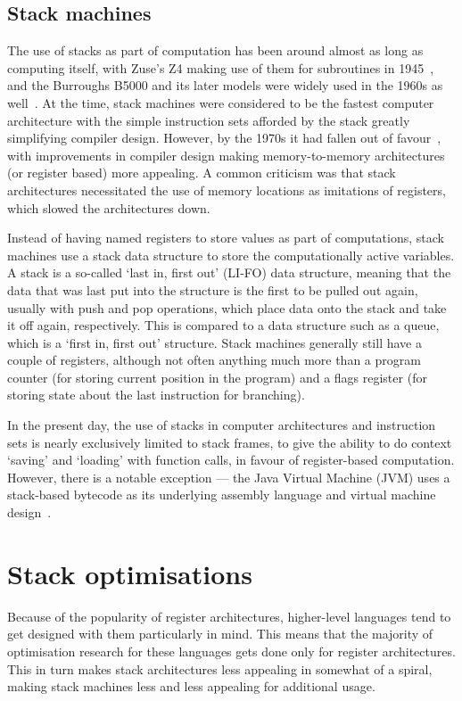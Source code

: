 \subsection{Stack machines}

The use of stacks as part of computation has been around almost as long as
computing itself, with Zuse's Z4 making use of them for subroutines in
1945~\cite{Speiser2000KZZ}, and the Burroughs B5000 and its later models were
widely used in the 1960s as well~\cite{Organick2014Computer}. At the time, stack
machines were considered to be the fastest computer architecture with the simple
instruction sets afforded by the stack greatly simplifying compiler design.
However, by the 1970s it had fallen out of favour~\cite{Myers1977CAS}, with
improvements in compiler design making memory-to-memory architectures (or
register based) more appealing. A common criticism was that stack architectures
necessitated the use of memory locations as imitations of registers, which
slowed the architectures down.

Instead of having named registers to store values as part of computations, stack
machines use a stack data structure to store the computationally active
variables. A stack is a so-called `last in, first out' (LI-FO) data structure,
meaning that the data that was last put into the structure is the first to be
pulled out again, usually with push and pop operations, which place data onto
the stack and take it off again, respectively. This is compared to a data
structure such as a queue, which is a `first in, first out' structure. Stack
machines generally still have a couple of registers, although not often anything
much more than a program counter (for storing current position in the program)
and a flags register (for storing state about the last instruction for
branching).

In the present day, the use of stacks in computer architectures and instruction
sets is nearly exclusively limited to stack frames, to give the ability to do
context `saving' and `loading' with function calls, in favour of register-based
computation. However, there is a notable exception --- the Java Virtual Machine
(JVM) uses a stack-based bytecode as its underlying assembly language and
virtual machine design~\cite{Schoeberl2005Design}.

\section{Stack optimisations}
Because of the popularity of register architectures, higher-level languages tend
to get designed with them particularly in mind. This means that the majority of
optimisation research for these languages gets done only for register
architectures. This in turn makes stack architectures less appealing in somewhat
of a spiral, making stack machines less and less appealing for additional usage.

